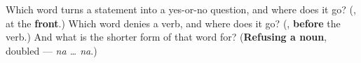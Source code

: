 \begin{tcolorbox}[breakable,colback=teal!4,colframe=teal!35!black,title={Before you move on}]
Which word turns a statement into a yes-or-no question, and where does it go? (\textbf{}, at the \textbf{front}.) Which word denies a verb, and where does it go? (\textbf{}, \textbf{before} the verb.) And what is the shorter form of that word for? (\textbf{Refusing a noun}, doubled — \emph{na … na}.)
\end{tcolorbox}
